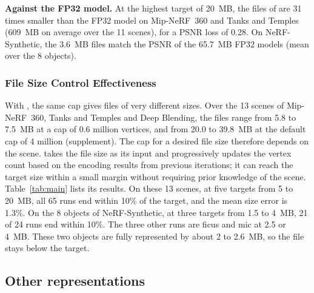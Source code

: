 \noindent\textbf{Against the FP32 model.} At the highest target of 20~MB, the files of \BM are 31 times smaller than the FP32 model on Mip-NeRF~360 and Tanks and Temples (609~MB on average over the 11 scenes), for a PSNR loss of 0.28\dB. On NeRF-Synthetic, the 3.6~MB files match the PSNR of the 65.7~MB FP32 models (mean over the 8 objects).

\subsubsection{File Size Control Effectiveness}
With \MSc, the same cap gives files of very different sizes. Over the 13 scenes of Mip-NeRF~360, Tanks and Temples and Deep Blending, the files range from 5.8 to 7.5~MB at a cap of 0.6 million vertices, and from 20.0 to 39.8~MB at the default cap of 4 million (supplement). The cap for a desired file size therefore depends on the scene. \BM takes the file size as its input and progressively updates the vertex count based on the encoding results from previous iterations; it can reach the target size within a small margin without requiring prior knowledge of the scene. Table~\ref{tab:main} lists its results. On these 13 scenes, at five targets from 5 to 20~MB, all 65 runs end within 10\% of the target, and the mean size error is 1.3\%. On the 8 objects of NeRF-Synthetic, at three targets from 1.5 to 4~MB, 21 of 24 runs end within 10\%. The three other runs are ficus and mic at 2.5 or 4~MB. These two objects are fully represented by about 2 to 2.6~MB, so the file stays below the target.

\subsection{Other representations}
\label{sec:cross}

